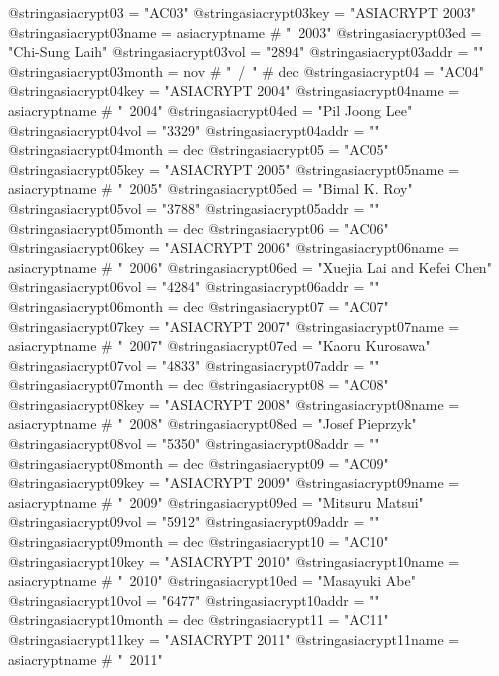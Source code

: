 @string{asiacrypt03 =           "AC03"}
@string{asiacrypt03key =        "ASIACRYPT 2003"}
@string{asiacrypt03name =       asiacryptname # "~2003"}
@string{asiacrypt03ed =         "Chi-Sung Laih"}
@string{asiacrypt03vol =        "2894"}
@string{asiacrypt03addr =       ""}
@string{asiacrypt03month =      nov # "~/~" # dec}
@string{asiacrypt04 =           "AC04"}
@string{asiacrypt04key =        "ASIACRYPT 2004"}
@string{asiacrypt04name =       asiacryptname # "~2004"}
@string{asiacrypt04ed =         "Pil Joong Lee"}
@string{asiacrypt04vol =        "3329"}
@string{asiacrypt04addr =       ""}
@string{asiacrypt04month =      dec}
@string{asiacrypt05 =           "AC05"}
@string{asiacrypt05key =        "ASIACRYPT 2005"}
@string{asiacrypt05name =       asiacryptname # "~2005"}
@string{asiacrypt05ed =         "Bimal K. Roy"}
@string{asiacrypt05vol =        "3788"}
@string{asiacrypt05addr =       ""}
@string{asiacrypt05month =      dec}
@string{asiacrypt06 =           "AC06"}
@string{asiacrypt06key =        "ASIACRYPT 2006"}
@string{asiacrypt06name =       asiacryptname # "~2006"}
@string{asiacrypt06ed =         "Xuejia Lai and Kefei Chen"}
@string{asiacrypt06vol =        "4284"}
@string{asiacrypt06addr =       ""}
@string{asiacrypt06month =      dec}
@string{asiacrypt07 =           "AC07"}
@string{asiacrypt07key =        "ASIACRYPT 2007"}
@string{asiacrypt07name =       asiacryptname # "~2007"}
@string{asiacrypt07ed =         "Kaoru Kurosawa"}
@string{asiacrypt07vol =        "4833"}
@string{asiacrypt07addr =       ""}
@string{asiacrypt07month =      dec}
@string{asiacrypt08 =           "AC08"}
@string{asiacrypt08key =        "ASIACRYPT 2008"}
@string{asiacrypt08name =       asiacryptname # "~2008"}
@string{asiacrypt08ed =         "Josef Pieprzyk"}
@string{asiacrypt08vol =        "5350"}
@string{asiacrypt08addr =       ""}
@string{asiacrypt08month =      dec}
@string{asiacrypt09 =           "AC09"}
@string{asiacrypt09key =        "ASIACRYPT 2009"}
@string{asiacrypt09name =       asiacryptname # "~2009"}
@string{asiacrypt09ed =         "Mitsuru Matsui"}
@string{asiacrypt09vol =        "5912"}
@string{asiacrypt09addr =       ""}
@string{asiacrypt09month =      dec}
@string{asiacrypt10 =           "AC10"}
@string{asiacrypt10key =        "ASIACRYPT 2010"}
@string{asiacrypt10name =       asiacryptname # "~2010"}
@string{asiacrypt10ed =         "Masayuki Abe"}
@string{asiacrypt10vol =        "6477"}
@string{asiacrypt10addr =       ""}
@string{asiacrypt10month =      dec}
@string{asiacrypt11 =           "AC11"}
@string{asiacrypt11key =        "ASIACRYPT 2011"}
@string{asiacrypt11name =       asiacryptname # "~2011"}
